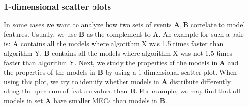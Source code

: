 \subsubsection*{1-dimensional scatter plots} \label{plot:1Dscatter}
In some cases we want to analyze how two sets of events $\mathbf{A}, \mathbf{B}$ correlate to model features. 
Usually, we use $\mathbf{B}$ as the complement to $\mathbf{A}$.
An example for such a pair is: 
$\mathbf{A}$ contains all the models where algorithm X was 1.5 times faster than algorithm Y.
$\mathbf{B}$ contains all the models where algorithm X was not 1.5 times faster than algorithm Y.
Next, we study the properties of the models in $\mathbf{A}$ and the properties of the models in $\mathbf{B}$ 
by using a 1-dimensional scatter plot. When using this plot, we try to identify whether models in $\mathbf{A}$ distribute
differently along the spectrum of feature values than $\mathbf{B}$.
For example, we may find that all models in set $\mathbf{A}$ have smaller MECs than models in $\mathbf{B}$.

